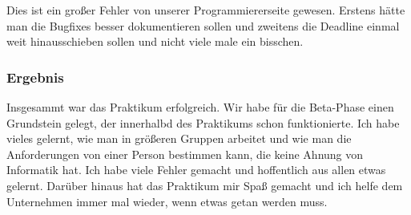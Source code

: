 Dies ist ein großer Fehler von unserer Programmiererseite gewesen. Erstens hätte man die Bugfixes besser dokumentieren sollen und zweitens die Deadline einmal weit hinausschieben sollen und nicht viele male ein bisschen.\\

\subsubsection{Ergebnis}

Insgesammt war das Praktikum erfolgreich. Wir habe für die Beta-Phase einen Grundstein gelegt, der innerhalbd des Praktikums schon funktionierte. Ich habe vieles gelernt, wie man in größeren Gruppen arbeitet und wie man die Anforderungen von einer Person bestimmen kann, die keine Ahnung von Informatik hat. Ich habe viele Fehler gemacht und hoffentlich aus allen etwas gelernt. Darüber hinaus hat das Praktikum mir Spaß gemacht und ich helfe dem Unternehmen immer mal wieder, wenn etwas getan werden muss.